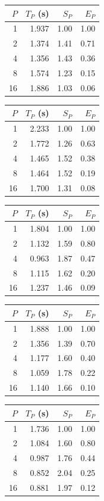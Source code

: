 \begin{tabular}{rrrr}\hline
$P$ & $T_P$ (s) & $S_P$ & $E_P$ \\ \hline
1 & 1.937 & 1.00 & 1.00 \\
2 & 1.374 & 1.41 & 0.71 \\
4 & 1.356 & 1.43 & 0.36 \\
8 & 1.574 & 1.23 & 0.15 \\
16 & 1.886 & 1.03 & 0.06 \\
\hline\end{tabular}

\begin{tabular}{rrrr}\hline
$P$ & $T_P$ (s) & $S_P$ & $E_P$ \\ \hline
1 & 2.233 & 1.00 & 1.00 \\
2 & 1.772 & 1.26 & 0.63 \\
4 & 1.465 & 1.52 & 0.38 \\
8 & 1.464 & 1.52 & 0.19 \\
16 & 1.700 & 1.31 & 0.08 \\
\hline\end{tabular}

\begin{tabular}{rrrr}\hline
$P$ & $T_P$ (s) & $S_P$ & $E_P$ \\ \hline
1 & 1.804 & 1.00 & 1.00 \\
2 & 1.132 & 1.59 & 0.80 \\
4 & 0.963 & 1.87 & 0.47 \\
8 & 1.115 & 1.62 & 0.20 \\
16 & 1.237 & 1.46 & 0.09 \\
\hline\end{tabular}

\begin{tabular}{rrrr}\hline
$P$ & $T_P$ (s) & $S_P$ & $E_P$ \\ \hline
1 & 1.888 & 1.00 & 1.00 \\
2 & 1.356 & 1.39 & 0.70 \\
4 & 1.177 & 1.60 & 0.40 \\
8 & 1.059 & 1.78 & 0.22 \\
16 & 1.140 & 1.66 & 0.10 \\
\hline\end{tabular}

\begin{tabular}{rrrr}\hline
$P$ & $T_P$ (s) & $S_P$ & $E_P$ \\ \hline
1 & 1.736 & 1.00 & 1.00 \\
2 & 1.084 & 1.60 & 0.80 \\
4 & 0.987 & 1.76 & 0.44 \\
8 & 0.852 & 2.04 & 0.25 \\
16 & 0.881 & 1.97 & 0.12 \\
\hline\end{tabular}

